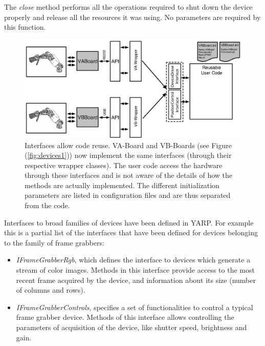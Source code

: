The \emph{close} method performs all the operations required to shut down 
the device properly and release all the resources it was using. No
parameters are required by this function.



\begin{figure}[tbp]
\centerline{
\includegraphics[width=24cm]{fig-devices2}
}
\caption{Interfaces allow code reuse. VA-Board and VB-Boards (see 
Figure (\ref{fig:devices1})) now implement
the same interfaces (through their respective wrapper classes). The user 
code access the hardware through these interfaces and is not aware of 
the details of how the methods are actually implemented. The different 
initialization parameters are listed in configuration files and are thus 
separated from the code.}\label{fig:devices2}
\end{figure}

Interfaces to broad families of devices have been defined in YARP. For 
example this is a partial list of the interfaces that have been defined 
for devices belonging to the family of frame grabbers:

\begin{itemize}

\item \emph{IFrameGrabberRgb}, which defines the interface to devices 
which generate a stream of color images. Methods in this interface 
provide access to the most recent frame acquired by the device, and 
information about its size (number of columns and rows).

\item \emph{IFrameGrabberControls}, specifies a set of functionalities 
to control a typical frame grabber device. Methods of this interface 
allows controlling the parameters of acquisition of the device, like 
shutter speed, brightness and gain.

\end{itemize}

